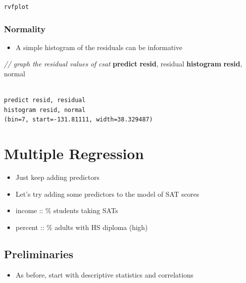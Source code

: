 \documentclass[]{book}
\newenvironment{Shaded}{\begin{snugshade}}{\end{snugshade}}
\newcommand{\CommentTok}[1]{\textcolor[rgb]{0.56,0.35,0.01}{\textit{#1}}}
\newcommand{\FunctionTok}[1]{\textcolor[rgb]{0.00,0.00,0.00}{#1}}
\newcommand{\KeywordTok}[1]{\textcolor[rgb]{0.13,0.29,0.53}{\textbf{#1}}}
\newcommand{\NormalTok}[1]{#1}
\providecommand{\tightlist}{%
  \setlength{\itemsep}{0pt}\setlength{\parskip}{0pt}}
\begin{document}
\begin{verbatim}
rvfplot
\end{verbatim}

\hypertarget{normality}{%
\subsubsection{Normality}\label{normality}}

\begin{itemize}
\tightlist
\item
  A simple histogram of the residuals can be informative
\end{itemize}

\begin{Shaded}
\begin{Highlighting}[]
  \CommentTok{// graph the residual values of csat}
  \KeywordTok{predict} \KeywordTok{resid}\NormalTok{, residual}
  \KeywordTok{histogram} \KeywordTok{resid}\NormalTok{, }\FunctionTok{normal} 
\end{Highlighting}
\end{Shaded}

\begin{verbatim}

predict resid, residual
histogram resid, normal
(bin=7, start=-131.81111, width=38.329487)
\end{verbatim}

\hypertarget{multiple-regression}{%
\section{Multiple Regression}\label{multiple-regression}}

\begin{itemize}
\tightlist
\item
  Just keep adding predictors
\item
  Let's try adding some predictors to the model of SAT scores
\item
  income :: \% students taking SATs
\item
  percent :: \% adults with HS diploma (high)
\end{itemize}

\hypertarget{preliminaries-1}{%
\subsection{Preliminaries}\label{preliminaries-1}}

\begin{itemize}
\tightlist
\item
  As before, start with descriptive statistics and correlations
\end{itemize}
\end{document}
